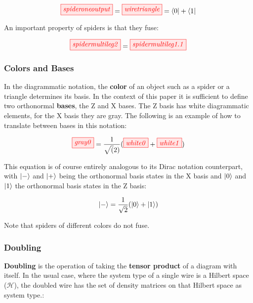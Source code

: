 \documentclass[]{article}
\begin{document}
\begin{equation}
\tikzfig{spideroneoutput} = \tikzfig{wiretriangle} = \bra{0} + \bra{1}
\end{equation}

An important property of spiders is that they fuse:

\begin{equation}
	\tikzfig{spidermultileg2} = \tikzfig{spidermultileg1.1}
\end{equation}



\subsubsection{Colors and Bases}
\label{coloursandbases}

In the diagrammatic notation, the \textbf{color} of an object such as a spider or a triangle determines its basis. In the context of this paper it is sufficient to define two orthonormal \textbf{bases}, the Z and X bases. The Z basis has white diagrammatic elements, for the X basis they are gray. The following is an example of how to translate between bases in this notation:

\begin{equation}
\tikzfig{gray0} =\frac{1}{\sqrt(2)}( \tikzfig{white0} + \tikzfig{white1})
\end{equation}

This equation is of course entirely analogous to its Dirac notation counterpart, with $\ket{-}$ and $\ket{+}$ being the orthonormal basis states in the X basis and $\ket{0}$ and $\ket{1}$ the orthonormal basis states in the Z basis:

\begin{equation}
\ket{-} = \frac{1}{\sqrt{2}}(\ket{0} + \ket{1})
\end{equation}

Note that spiders of different colors do not fuse.

\subsubsection{Doubling}
\label{doubling}

\textbf{Doubling} is the operation of taking the \textbf{tensor product} of a diagram with itself. In the usual case, where the system type of a single wire is a Hilbert space ($\mathcal{H}$), the doubled wire has the set of density matrices on that Hilbert space as system type.:
\end{document}
